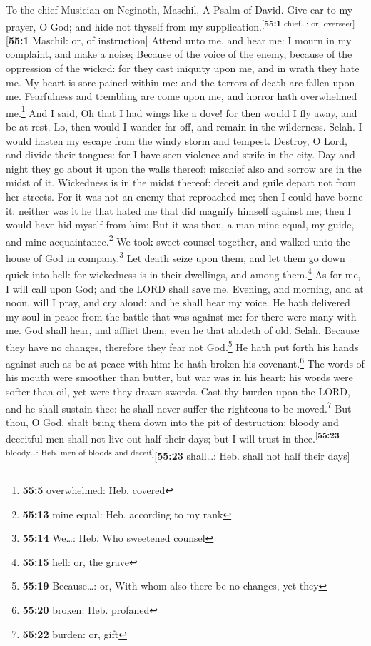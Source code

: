To the chief Musician on Neginoth, Maschil, A Psalm of David.
 Give ear to my prayer, O God; and hide not thyself from
my supplication.\textsuperscript{{[}\textbf{55:1} chief\ldots: or,
overseer{]}}{[}\textbf{55:1} Maschil: or, of instruction{]}
 Attend unto me, and hear me: I mourn in my complaint, and
make a noise;  Because of the voice of the enemy, because
of the oppression of the wicked: for they cast iniquity upon me, and in
wrath they hate me.  My heart is sore pained within me:
and the terrors of death are fallen upon me.  Fearfulness
and trembling are come upon me, and horror hath overwhelmed
me.\footnote{\textbf{55:5} overwhelmed: Heb. covered}  And
I said, Oh that I had wings like a dove! for then would I fly away, and
be at rest.  Lo, then would I wander far off, and remain
in the wilderness. Selah.  I would hasten my escape from
the windy storm and tempest.  Destroy, O Lord, and divide
their tongues: for I have seen violence and strife in the city.
 Day and night they go about it upon the walls thereof:
mischief also and sorrow are in the midst of it. 
Wickedness is in the midst thereof: deceit and guile depart not from her
streets.  For it was not an enemy that reproached me;
then I could have borne it: neither was it he that hated me that did
magnify himself against me; then I would have hid myself from him:
 But it was thou, a man mine equal, my guide, and mine
acquaintance.\footnote{\textbf{55:13} mine equal: Heb. according to my
  rank}  We took sweet counsel together, and walked unto
the house of God in company.\footnote{\textbf{55:14} We\ldots: Heb. Who
  sweetened counsel}  Let death seize upon them, and let
them go down quick into hell: for wickedness is in their dwellings, and
among them.\footnote{\textbf{55:15} hell: or, the grave} 
As for me, I will call upon God; and the LORD shall save me.
 Evening, and morning, and at noon, will I pray, and cry
aloud: and he shall hear my voice.  He hath delivered my
soul in peace from the battle that was against me: for there were many
with me.  God shall hear, and afflict them, even he that
abideth of old. Selah. Because they have no changes, therefore they fear
not God.\footnote{\textbf{55:19} Because\ldots: or, With whom also there
  be no changes, yet they}  He hath put forth his hands
against such as be at peace with him: he hath broken his
covenant.\footnote{\textbf{55:20} broken: Heb. profaned} 
The words of his mouth were smoother than butter, but war was in his
heart: his words were softer than oil, yet were they drawn swords.
 Cast thy burden upon the LORD, and he shall sustain
thee: he shall never suffer the righteous to be moved.\footnote{\textbf{55:22}
  burden: or, gift}  But thou, O God, shalt bring them
down into the pit of destruction: bloody and deceitful men shall not
live out half their days; but I will trust in
thee.\textsuperscript{{[}\textbf{55:23} bloody\ldots: Heb. men of bloods
and deceit{]}}{[}\textbf{55:23} shall\ldots: Heb. shall not half their
days{]}

